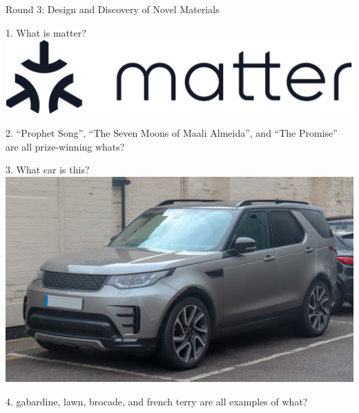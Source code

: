 \begin{frame}
\begin{center}
\Huge
Round 3: Design and Discovery of Novel Materials
\end{center}
\end{frame}
\begin{frame}
\begin{center}
\Large
1. What is matter?
\\
\vspace{0.5em}\includegraphics[height=0.25\paperheight]{images/matter.png}
\end{center}
\end{frame}
\begin{frame}
\begin{center}
\Large
2. ``Prophet Song'', ``The Seven Moons of Maali Almeida'', and ``The Promise'' are all prize-winning whats?
\end{center}
\end{frame}
\begin{frame}
\begin{center}
\Large
3. What car is this?
\\
\vspace{0.5em}\includegraphics[height=0.6\paperheight]{images/land_rover_discovery.jpg}
\end{center}
\end{frame}
\begin{frame}
\begin{center}
\Large
4. gabardine, lawn, brocade, and french terry are all examples of what?
\end{center}
\end{frame}
